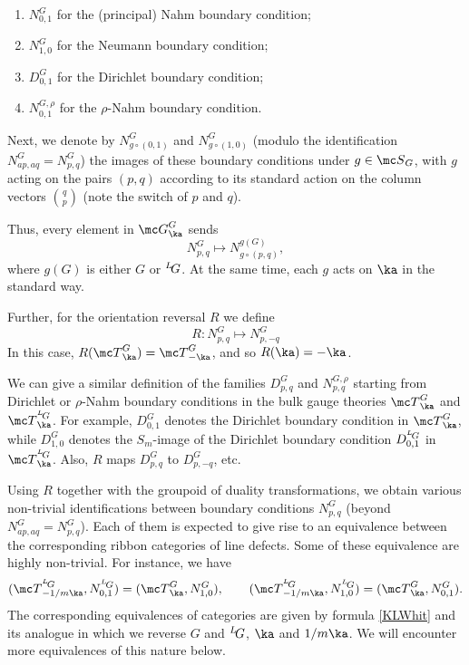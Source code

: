 \documentclass[11pt,reqno]{amsart}
\theoremstyle{plain}
\numberwithin{equation}{section}
\def\neg{\negthinspace}
\def\LG{{}^L\neg G}
\theoremstyle{definition}
\begin{document}
\medskip

\begin{enumerate}

\item $N^G_{0,1}$ for the (principal) Nahm
boundary condition;

\medskip

\item $N^G_{1,0}$ for the Neumann boundary condition;

\medskip

\item $D^G_{0,1}$ for the Dirichlet boundary condition;

\medskip

\item $N^{G,\rho}_{0,1}$ for the $\rho$-Nahm boundary condition.
\end{enumerate}

\bigskip

Next, we denote by $N^G_{g \circ (0,1)}$ and $N^G_{g \circ (1,0)}$
(modulo the identification $N^G_{ap,aq} = N^G_{p,q}$) the images of
these boundary conditions under $g \in {\mc S}_G$, with $g$ acting on
the pairs $(p,q)$ according to its standard action on the column
vectors ${q \choose p}$ (note the switch of $p$ and $q$).

Thus, every element in ${\mc G}^G_\ka$ sends
$$
N^G_{p,q} \mapsto N^{g(G)}_{g \circ (p,q)},
$$
where $g(G)$ is either $G$ or $\LG$. At the same time, each $g$ acts
on $\ka$ in the standard way.

Further, for the orientation reversal $R$ we define
$$
R: N^G_{p,q} \mapsto N^G_{p,-q}
$$
In this case, $R({\mc T}^G_\ka) = {\mc T}^G_{-\ka}$, and so $R(\ka) =
-\ka$.

We can give a similar definition of the families $D^G_{p,q}$ and
$N^{G, \rho}_{p,q}$ starting from Dirichlet or $\rho$-Nahm boundary
conditions in the bulk gauge theories ${\mc T}^G_\ka$ and ${\mc
  T}^{\LG}_\ka$. For example, $D^G_{0,1}$ denotes the Dirichlet
boundary condition in ${\mc T}^G_\ka$, while $D^G_{1,0}$ denotes the
$S_m$-image of the Dirichlet boundary condition $D^{\LG}_{0,1}$ in
${\mc T}^{\LG}_\ka$. Also, $R$ maps $D^G_{p,q}$ to $D^G_{p,-q}$, etc.

Using $R$ together with the groupoid of duality transformations, we
obtain various non-trivial identifications between boundary conditions
$N^G_{p,q}$ (beyond $N^G_{ap,aq} = N^G_{p,q}$). Each of them is
expected to give rise to an equivalence between the corresponding
ribbon categories of line defects. Some of these equivalence are
highly non-trivial. For instance, we have
\begin{equation}    \label{identS}
({\mc T}^{\LG}_{-1/m\ka},N^{\LG}_{0,1}) =
({\mc T}^G_\ka,N^G_{1,0}), \qquad ({\mc T}^{\LG}_{-1/m\ka},N^{\LG}_{1,0}) =
({\mc T}^G_\ka,N^G_{0,1}).
\end{equation}
The corresponding equivalences of categories are given by formula
\eqref{KLWhit} and its analogue in which we reverse $G$ and $\LG$,
$\ka$ and $1/m\ka$. We will encounter more equivalences of this nature
below.
\end{document}
